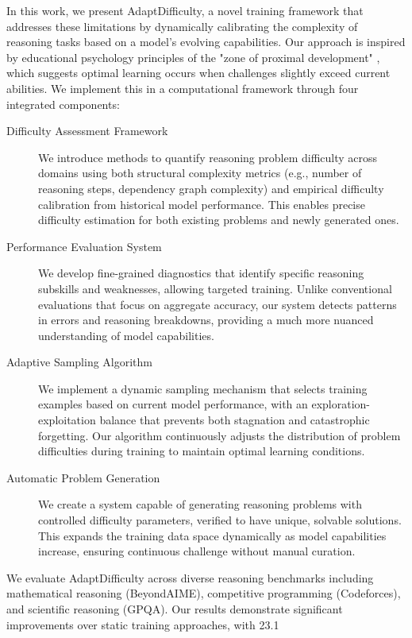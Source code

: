 In this work, we present AdaptDifficulty, a novel training framework that addresses these limitations by dynamically calibrating the complexity of reasoning tasks based on a model's evolving capabilities. Our approach is inspired by educational psychology principles of the "zone of proximal development" \cite{vygotsky1978mind}, which suggests optimal learning occurs when challenges slightly exceed current abilities. We implement this in a computational framework through four integrated components:

\begin{description}
\item[Difficulty Assessment Framework] We introduce methods to quantify reasoning problem difficulty across domains using both structural complexity metrics (e.g., number of reasoning steps, dependency graph complexity) and empirical difficulty calibration from historical model performance. This enables precise difficulty estimation for both existing problems and newly generated ones.

\item[Performance Evaluation System] We develop fine-grained diagnostics that identify specific reasoning subskills and weaknesses, allowing targeted training. Unlike conventional evaluations that focus on aggregate accuracy, our system detects patterns in errors and reasoning breakdowns, providing a much more nuanced understanding of model capabilities.

\item[Adaptive Sampling Algorithm] We implement a dynamic sampling mechanism that selects training examples based on current model performance, with an exploration-exploitation balance that prevents both stagnation and catastrophic forgetting. Our algorithm continuously adjusts the distribution of problem difficulties during training to maintain optimal learning conditions.

\item[Automatic Problem Generation] We create a system capable of generating reasoning problems with controlled difficulty parameters, verified to have unique, solvable solutions. This expands the training data space dynamically as model capabilities increase, ensuring continuous challenge without manual curation.
\end{description}

We evaluate AdaptDifficulty across diverse reasoning benchmarks including mathematical reasoning (BeyondAIME), competitive programming (Codeforces), and scientific reasoning (GPQA). Our results demonstrate significant improvements over static training approaches, with 23.1%

